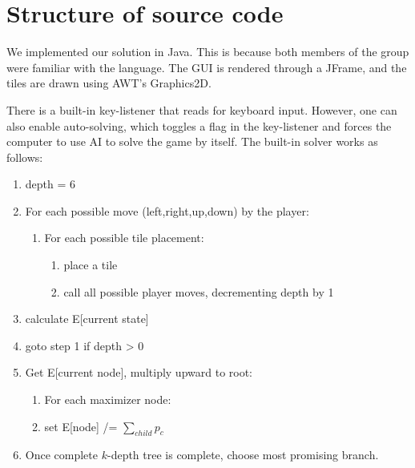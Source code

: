 \documentclass[journal]{IEEEtran}
\begin{document}
\newpage
\section*{Structure of source code}
We implemented our solution in Java. This is because both members of the group
were familiar with the language. The GUI is rendered through a JFrame, and the tiles are
drawn using AWT's Graphics2D.

There is a built-in key-listener that reads for keyboard input. However, one can also
enable auto-solving, which toggles a flag in the key-listener and forces the computer
to use AI to solve the game by itself. The built-in solver works as follows:
\begin{framed}
\begin{enumerate}
    \item depth = 6
    \item For each possible move (left,right,up,down) by the player:
    \begin{enumerate}
    \item For each possible tile placement:
        \begin{enumerate}
            \item place a tile
            \item call all possible player moves,
                decrementing depth by 1
        \end{enumerate}
    \end{enumerate}
    \item calculate E[current state]
    \item \dotso{} goto step 1 if depth \textgreater{} 0
    \item Get E[current node], multiply upward to root:
        \begin{enumerate}
            \item For each maximizer node:
            \item set E[node] /= $\sum\limits_{child}{p_{c}}$
        \end{enumerate}
    \item Once complete $k$-depth tree is complete, choose most promising branch.
\end{enumerate}
\end{framed}
\end{document}
